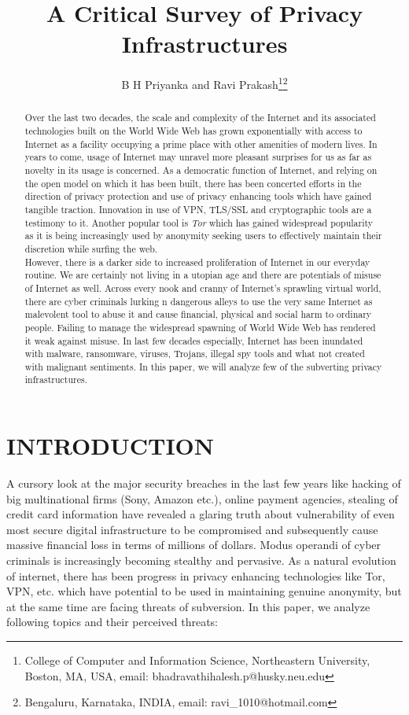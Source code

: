 \documentclass[letterpaper, 10 pt, conference]{ieeeconf}
\title{\LARGE \bf
A Critical Survey of Privacy Infrastructures
}
\author{B H Priyanka and Ravi Prakash\thanks{College of Computer and Information Science, Northeastern 	         	         University, Boston, MA, USA,
              email: bhadravathihalesh.p@husky.neu.edu}\thanks{ Bengaluru, Karnataka, INDIA,
               email: ravi\_1010@hotmail.com}}
\begin{document}
\maketitle
\thispagestyle{empty}
\pagestyle{empty}


\begin{abstract}
Over the last two decades, the scale and complexity of the Internet and its associated technologies built on the World Wide Web has grown exponentially with access to Internet as a facility occupying a prime place with other amenities of modern lives. In years to come, usage of Internet may unravel more pleasant surprises for us as far as novelty in its usage is concerned. As a democratic function of Internet, and relying on the open model on which it has been built, there has been concerted efforts in the direction of privacy protection and use of privacy enhancing tools which have gained tangible traction. Innovation in use of VPN, TLS/SSL and cryptographic tools are a testimony to it. Another popular tool is \textit{Tor} which has gained widespread popularity as it is being increasingly used by anonymity seeking users to effectively maintain their discretion while surfing the web. \\

However, there is a darker side to increased proliferation of Internet in our everyday routine. We are certainly not living in a utopian age and there are potentials of misuse of Internet as well. Across every nook and cranny of Internet's sprawling virtual world, there are cyber criminals lurking n dangerous alleys to use the very same Internet as malevolent tool to abuse it and cause financial, physical and social harm to ordinary people. Failing to manage the widespread spawning of World Wide Web has rendered it weak against misuse. In last few decades especially, Internet has been inundated with malware, ransomware, viruses, Trojans, illegal spy tools and what not created with malignant sentiments. In this paper, we will analyze few of the subverting privacy infrastructures. \\
\end{abstract}


\section{INTRODUCTION}
A cursory look at the major security breaches in the last few years like hacking of big multinational firms (Sony, Amazon etc.), online payment agencies, stealing of credit card information have revealed a glaring truth about vulnerability of even most secure digital infrastructure to be compromised and subsequently cause massive financial loss in terms of millions of dollars. Modus operandi of cyber criminals is increasingly becoming stealthy and pervasive. As a natural evolution of internet, there has been progress in privacy enhancing technologies like Tor, VPN, etc. which have potential to be used in maintaining genuine anonymity, but at the same time are facing threats of subversion. In this paper, we analyze following topics and their perceived threats:\\
\end{document}
